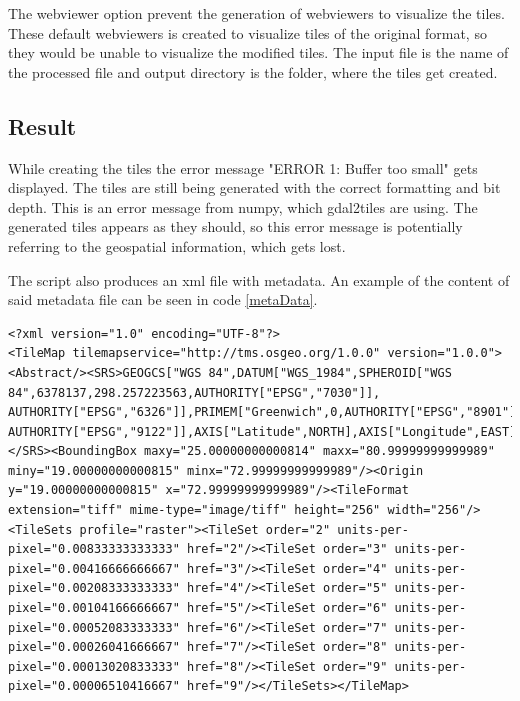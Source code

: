 The webviewer option prevent the generation of webviewers to visualize the tiles. These default webviewers is created to visualize tiles of the original format, so they would be unable to visualize the modified tiles. 
The input file is the name of the processed file and output directory is the folder, where the tiles get created. 
\subsection{Result}

While creating the tiles the error message "ERROR 1: Buffer too small" gets displayed. The tiles are still being generated with the correct formatting and bit depth. This is an error message from numpy, which gdal2tiles are using. 
\citep{MoreThan8}
The generated tiles appears as they should, so this error message is potentially referring to the geospatial information, which gets lost.


The script also produces an xml file with metadata. An example of the content of said metadata file can be seen in code \ref{metaData}.

\begin{lstlisting}[language=HTML5, caption={The metadata from the xml file generated by the modified gdal2tiles}, label= metaData,escapechar=|]
<?xml version="1.0" encoding="UTF-8"?>
<TileMap tilemapservice="http://tms.osgeo.org/1.0.0" version="1.0.0"><Abstract/><SRS>GEOGCS["WGS 84",DATUM["WGS_1984",SPHEROID["WGS 84",6378137,298.257223563,AUTHORITY["EPSG","7030"]],
AUTHORITY["EPSG","6326"]],PRIMEM["Greenwich",0,AUTHORITY["EPSG","8901"]],UNIT["degree",0.0174532925199433,
AUTHORITY["EPSG","9122"]],AXIS["Latitude",NORTH],AXIS["Longitude",EAST],AUTHORITY["EPSG","4326"]]
</SRS><BoundingBox maxy="25.00000000000814" maxx="80.99999999999989" miny="19.00000000000815" minx="72.99999999999989"/><Origin y="19.00000000000815" x="72.99999999999989"/><TileFormat extension="tiff" mime-type="image/tiff" height="256" width="256"/><TileSets profile="raster"><TileSet order="2" units-per-pixel="0.00833333333333" href="2"/><TileSet order="3" units-per-pixel="0.00416666666667" href="3"/><TileSet order="4" units-per-pixel="0.00208333333333" href="4"/><TileSet order="5" units-per-pixel="0.00104166666667" href="5"/><TileSet order="6" units-per-pixel="0.00052083333333" href="6"/><TileSet order="7" units-per-pixel="0.00026041666667" href="7"/><TileSet order="8" units-per-pixel="0.00013020833333" href="8"/><TileSet order="9" units-per-pixel="0.00006510416667" href="9"/></TileSets></TileMap>
\end{lstlisting}


